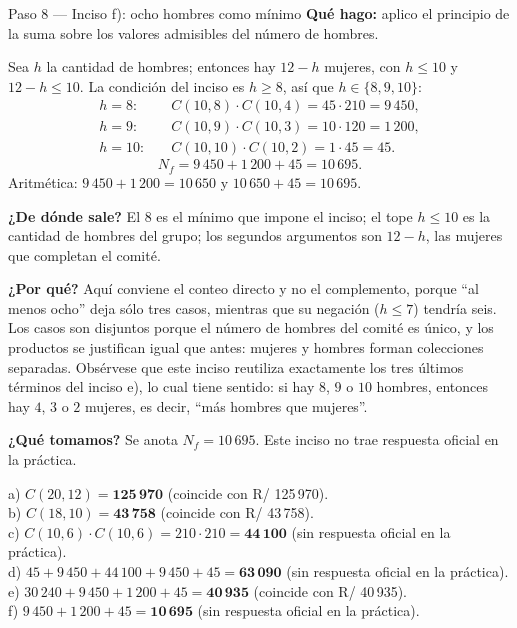\documentclass[11pt]{article}
\begin{document}
\begin{paso}{Paso 8 --- Inciso f): ocho hombres como mínimo}
\textbf{Qué hago:} aplico el principio de la suma sobre los valores admisibles del número de hombres.

Sea $h$ la cantidad de hombres; entonces hay $12-h$ mujeres, con $h\le 10$ y $12-h\le 10$. La condición del inciso es $h\ge 8$, así que $h\in\{8,9,10\}$:
\begin{align*}
  h=8:&\quad C(10,8)\cdot C(10,4)=45\cdot 210 = 9\,450,\\
  h=9:&\quad C(10,9)\cdot C(10,3)=10\cdot 120 = 1\,200,\\
  h=10:&\quad C(10,10)\cdot C(10,2)=1\cdot 45 = 45 .
\end{align*}
\[
  N_f = 9\,450+1\,200+45 = 10\,695 .
\]
Aritmética: $9\,450+1\,200=10\,650$ y $10\,650+45=10\,695$.

\textbf{¿De dónde sale?} El $8$ es el mínimo que impone el inciso; el tope $h\le 10$ es la cantidad de hombres del grupo; los segundos argumentos son $12-h$, las mujeres que completan el comité.

\textbf{¿Por qué?} Aquí conviene el conteo directo y no el complemento, porque ``al menos ocho'' deja sólo tres casos, mientras que su negación ($h\le 7$) tendría seis. Los casos son disjuntos porque el número de hombres del comité es único, y los productos se justifican igual que antes: mujeres y hombres forman colecciones separadas. Obsérvese que este inciso reutiliza exactamente los tres últimos términos del inciso e), lo cual tiene sentido: si hay $8$, $9$ o $10$ hombres, entonces hay $4$, $3$ o $2$ mujeres, es decir, ``más hombres que mujeres''.

\textbf{¿Qué tomamos?} Se anota $N_f=10\,695$. Este inciso no trae respuesta oficial en la práctica.
\end{paso}

\begin{resp}
a) $C(20,12)=\mathbf{125\,970}$ (coincide con R/ 125\,970).\\
b) $C(18,10)=\mathbf{43\,758}$ (coincide con R/ 43\,758).\\
c) $C(10,6)\cdot C(10,6)=210\cdot 210=\mathbf{44\,100}$ (sin respuesta oficial en la práctica).\\
d) $45+9\,450+44\,100+9\,450+45=\mathbf{63\,090}$ (sin respuesta oficial en la práctica).\\
e) $30\,240+9\,450+1\,200+45=\mathbf{40\,935}$ (coincide con R/ 40\,935).\\
f) $9\,450+1\,200+45=\mathbf{10\,695}$ (sin respuesta oficial en la práctica).
\end{resp}
\end{document}
